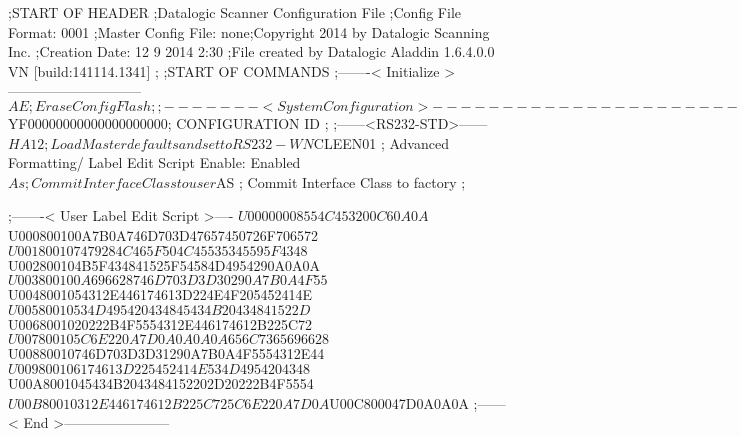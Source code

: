 ;START OF HEADER
;Datalogic Scanner Configuration File
;Config File Format: 0001
;Master Config File: none;Copyright 2014 by Datalogic Scanning Inc.
;Creation Date: 12 9 2014 2:30
;File created by Datalogic Aladdin 1.6.4.0.0 VN [build:141114.1341]
;
;START OF COMMANDS
;-------< Initialize >-----------------------------
$AE                 ; Erase Config Flash
;
;-------< System Configuration >-------------------------------
$YF00000000000000000000; CONFIGURATION ID
;
;------<RS232-STD>------
$HA12               ; Load Master defaults and set to RS232-WN
$CLEEN01            ; Advanced Formatting/ Label Edit Script Enable: Enabled
$As                 ; Commit Interface Class to user
$AS                 ; Commit Interface Class to factory
;

;-------< User Label Edit Script >----
$U00000008554C453200C60A0A
$U000800100A7B0A746D703D47657450726F706572
$U001800107479284C465F504C45535345595F4348
$U002800104B5F434841525F54584D4954290A0A0A
$U003800100A696628746D703D3D30290A7B0A4F55
$U0048001054312E446174613D224E4F205452414E
$U00580010534D495420434845434B20434841522D
$U0068001020222B4F5554312E446174612B225C72
$U007800105C6E220A7D0A0A0A0A656C7365696628
$U00880010746D703D3D31290A7B0A4F5554312E44
$U009800106174613D225452414E534D4954204348
$U00A8001045434B2043484152202D20222B4F5554
$U00B80010312E446174612B225C725C6E220A7D0A
$U00C800047D0A0A0A
;------< End >-----------------------
